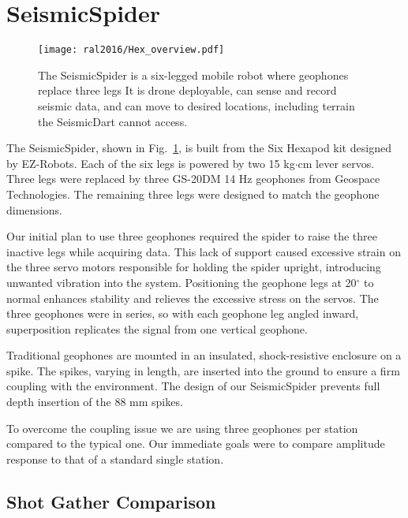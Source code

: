 \section[SeismicSpider]{SeismicSpider}

\begin{figure} \centering
	{\texttt{[image: ral2016/Hex\_overview.pdf]}}
	\caption{
		The SeismicSpider is a six-legged mobile robot where geophones replace three legs
		It is drone deployable, can sense and record seismic data, and can move to desired locations, including terrain the SeismicDart cannot access.}
	\label{fig:Hex_overview}
\end{figure}

The SeismicSpider, shown in Fig.~\ref{fig:Hex_overview}, is built from the Six Hexapod kit designed by EZ-Robots.
Each of the six legs is powered by two 15 kg$\cdot$cm lever servos.
Three legs were replaced by three GS-20DM 14 Hz geophones from Geospace Technologies.
The remaining three legs were designed to match the geophone dimensions.

Our initial plan to use three geophones required the spider to raise the three inactive legs while acquiring data.
This lack of support caused excessive strain on the three servo motors responsible for holding the spider upright, introducing unwanted vibration into the system.
Positioning the geophone legs at 20$^\circ$ to normal enhances stability and relieves the excessive stress on the servos.
The three geophones were in series, so with each geophone leg angled inward, superposition replicates the signal from one vertical geophone.

Traditional geophones are mounted in an insulated, shock-resistive enclosure on a spike.
The spikes, varying in length, are inserted into the ground to ensure a firm coupling with the environment.
The design of our SeismicSpider prevents full depth insertion of the 88 mm spikes.

To overcome the coupling issue we are using three geophones per station compared to the typical one.
Our immediate goals were to compare amplitude response to that of a standard single station.	
 
\subsection{Shot Gather Comparison}

